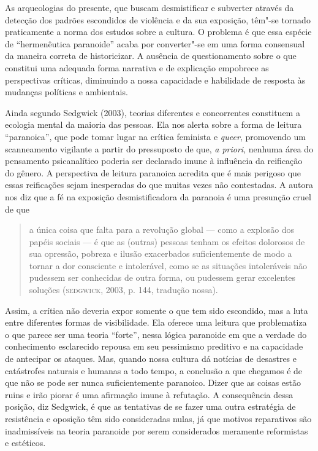 As arqueologias do presente, que buscam desmistificar e subverter
através da detecção dos padrões escondidos de violência e da sua
exposição, têm"-se tornado praticamente a norma dos estudos sobre a
cultura. O problema é que essa espécie de ``hermenêutica paranoide''
acaba por converter"-se em uma forma consensual da maneira correta de
historicizar. A ausência de questionamento sobre o que constitui uma
adequada forma narrativa e de explicação empobrece as perspectivas
críticas, diminuindo a nossa capacidade e habilidade de resposta às
mudanças políticas e ambientais.

Ainda segundo Sedgwick (2003), teorias diferentes e concorrentes
constituem a ecologia mental da maioria das pessoas. Ela nos alerta
sobre a forma de leitura ``paranoica'', que pode tomar lugar na crítica
feminista e \emph{queer}, promovendo um scanneamento vigilante a partir do
pressuposto de que, \emph{a priori}, nenhuma área do pensamento
psicanalítico poderia ser declarado imune à influência da reificação do
gênero. A perspectiva de leitura paranoica acredita que é mais perigoso
que essas reificações sejam inesperadas do que muitas vezes não
contestadas. A autora nos diz que a fé na exposição desmistificadora da
paranoia é uma presunção cruel de que

\begin{quote}
a única coisa que falta para a revolução global --- como a explosão dos
papéis sociais --- é que as (outras) pessoas tenham os efeitos dolorosos
de sua opressão, pobreza e ilusão exacerbados suficientemente de modo a
tornar a dor consciente e intolerável, como se as situações intoleráveis
não pudessem ser conhecidas de outra forma, ou pudessem gerar excelentes
soluções (\textsc{sedgwick}, 2003, p. 144, tradução nossa).
\end{quote}

Assim, a crítica não deveria expor somente o que tem sido escondido, mas
a luta entre diferentes formas de visibilidade. Ela oferece uma leitura
que problematiza o que parece ser uma teoria ``forte'', nessa lógica
paranoide em que a verdade do conhecimento esclarecido repousa em seu
pessimismo preditivo e na capacidade de antecipar os ataques. Mas,
quando nossa cultura dá notícias de desastres e catástrofes naturais e
humanas a todo tempo, a conclusão a que chegamos é de que não se pode
ser nunca suficientemente paranoico. Dizer que as coisas estão ruins e
irão piorar é uma afirmação imune à refutação. A consequência dessa
posição, diz Sedgwick, é que as tentativas de se fazer uma outra
estratégia de resistência e oposição têm sido consideradas nulas, já que
motivos reparativos são inadmissíveis na teoria paranoide por serem
considerados meramente reformistas e estéticos.

